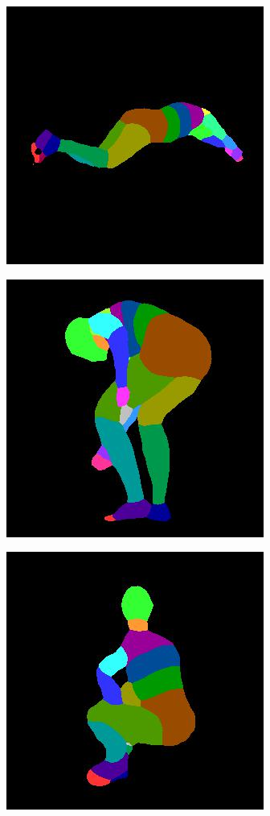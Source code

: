 \documentclass{beamer}
\begin{document}
\begin{frame}
\begin{figure}
\begin{subfigure}{.3\textwidth}
\end{subfigure}
\end{figure}
\begin{figure}
\centering
\begin{subfigure}{.31\textwidth}
\centering
  \includegraphics[scale=0.21]{ung_126_09_c0008_85.jpg}
\end{subfigure}%
\begin{subfigure}{.3\textwidth}
  \centering
  \includegraphics[scale=0.21]{ung_137_31_c0008_77.jpg}
\end{subfigure}
\begin{subfigure}{.3\textwidth}
  \centering
  \includegraphics[scale=0.21]{19_12_c0006_29.jpg}
\end{subfigure}
\end{figure}




\end{frame}
\end{document}

